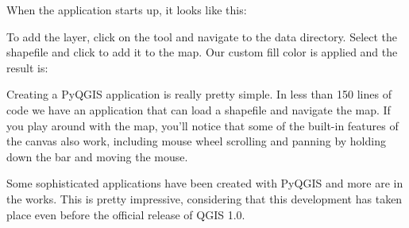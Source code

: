 When the application starts up, it looks like this:


To add the  layer, click on the 
 tool and navigate to the data directory.
Select the shapefile and click  to add it to the map. 
Our custom fill color is applied and the result is:


Creating a PyQGIS application is really pretty simple.  In less than 150 lines
of code we have an application that can load a shapefile and navigate the map.
If you play around with the map, you'll notice that some of the built-in
features of the canvas also work, including mouse wheel scrolling and panning
by holding down the  bar and moving the mouse.

Some sophisticated applications have been created with PyQGIS and more are in 
the works. This is pretty impressive, considering that this development has 
taken place even before the official release of QGIS 1.0.

